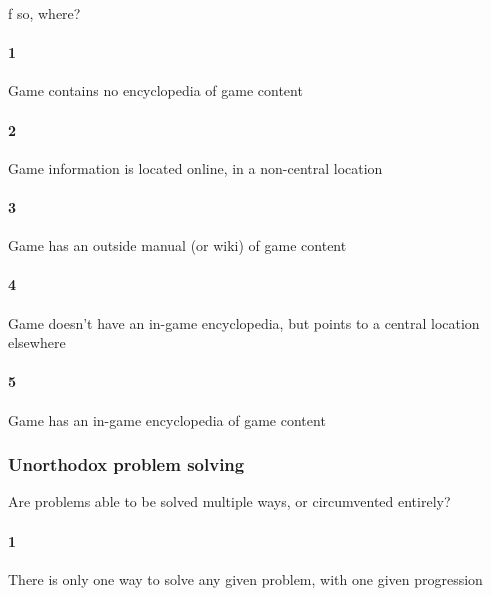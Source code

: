 f so, where?\paragraph{1}Game contains no encyclopedia of game content\paragraph{2}Game information is located online, in a non-central location\paragraph{3}Game has an outside manual (or wiki) of game content\paragraph{4}Game doesn't have an in-game encyclopedia, but points to a central location elsewhere\paragraph{5}Game has an in-game encyclopedia of game content\subsubsection{Unorthodox problem solving}Are problems able to be solved multiple ways, or circumvented entirely?\paragraph{1}There is only one way to solve any given problem, with one given progression